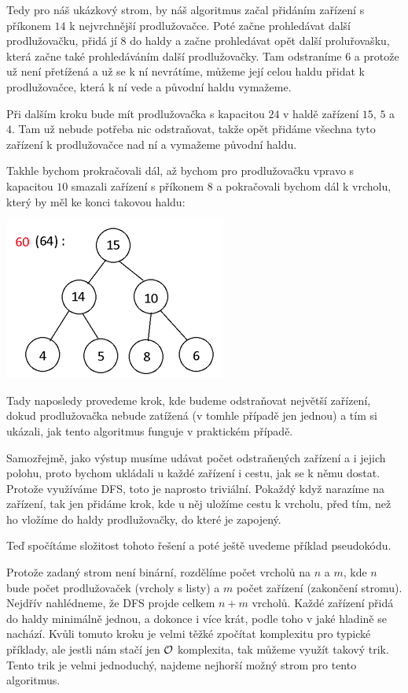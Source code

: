 \documentclass{../../../ksp}
\begin{document}
Tedy pro náš ukázkový strom, by náš algoritmus začal přidáním zařízení s příkonem $14$ k nejvrchnější prodlužovačce.
Poté začne prohledávat další prodlužovačku, přidá jí $8$ do haldy a začne prohledávat opět další proluřovašku, která začne také prohledáváním další prodlužovačky.
Tam odstraníme $6$ a protože už není přetížená a už se k ní nevrátíme, můžeme její celou haldu přidat k prodlužovačce, která k ní vede a původní haldu vymažeme.

Při dalším kroku bude mít prodlužovačka s kapacitou $24$ v haldě zařízení $15$, $5$ a $4$.
Tam už nebude potřeba nic odstraňovat, takže opět přidáme všechna tyto zařízení k prodlužovačce nad ní a vymažeme původní haldu.

Takhle bychom prokračovali dál, až bychom pro prodlužovačku vpravo s kapacitou $10$ smazali zařízení s příkonem $8$ a pokračovali bychom dál k vrcholu, který by měl ke konci takovou haldu:

\includegraphics{halda2}

Tady naposledy provedeme krok, kde budeme odstraňovat největší zařízení, dokud prodlužovačka nebude zatížená (v tomhle případě jen jednou)
a tím si ukázali, jak tento algoritmus funguje v praktickém případě.

Samozřejmě, jako výstup musíme udávat počet odstraňených zařízení a i jejich polohu, proto bychom ukládali u každé zařízení i cestu, jak se k němu dostat.
Protože využíváme DFS, toto je naprosto triviální. Pokaždý když narazíme na zařízení, tak jen přidáme krok, kde u něj uložíme cestu k vrcholu, před tím, než ho vložíme do haldy prodlužovačky, do které je zapojený.

Teď spočítáme složitost tohoto řešení a poté ještě uvedeme příklad pseudokódu.

Protože zadaný strom není binární, rozdělíme počet vrcholů na $n$ a $m$, kde $n$ bude počet prodlužovaček (vrcholy s listy) a $m$ počet zařízení (zakončení stromu).
Nejdřív nahlédneme, že DFS projde celkem $n+m$ vrcholů. Každé zařízení přidá do haldy minimálně jednou, a dokonce i více krát, podle toho v jaké hladině se nachází.
Kvůli tomuto kroku je velmi těžké zpočítat komplexitu pro typické příklady, ale jestli nám stačí jen $\mathcal{O}$ komplexita, tak můžeme využít takový trik.
Tento trik je velmi jednoduchý, najdeme nejhorší možný strom pro tento algoritmus.
\end{document}
